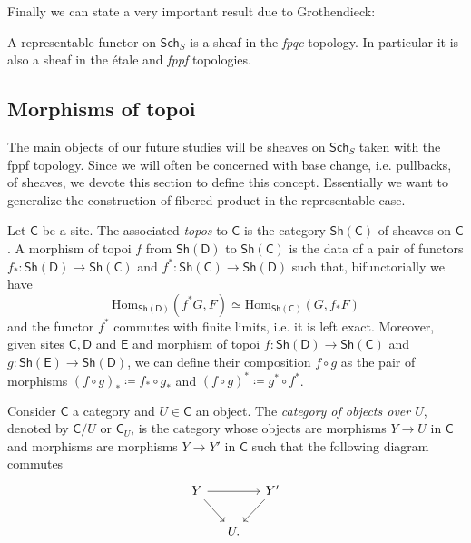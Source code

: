 \noindent
Finally we can state a very important result due to Grothendieck:
\begin{thm}\label{thm:reprFctSheaf}
	A representable functor on $\mathsf{Sch}_{ S }$ is a sheaf in the {\em fpqc} topology.
	In particular it is also a sheaf in the étale and {\em fppf} topologies.
\end{thm}



\subsection{Morphisms of topoi}
The main objects of our future studies will be sheaves on
$\mathsf{Sch}_{ S }$ taken with the fppf topology.
Since we will often be concerned with base change, i.e. pullbacks,
of sheaves, we devote this section to define this concept.
Essentially we want to generalize the construction
of fibered product in the representable case.


\begin{defn}[Topoi]
	Let $\mathsf{C}$ be a site.
	The associated {\em topos} to $\mathsf{C}$ is the category $\mathsf{Sh}\left(\mathsf{C}\right)$
	of sheaves on $\mathsf{C}$.
	A morphism of topoi $f$ from $\mathsf{Sh}\left(\mathsf{D}\right)$
	to $\mathsf{Sh}\left(\mathsf{C}\right)$ is the data of a pair
	of functors $f_*\colon \mathsf{Sh}\left(\mathsf{D}\right) \to \mathsf{Sh}\left(\mathsf{C}\right)$
	and $f^*\colon \mathsf{Sh}\left(\mathsf{C}\right) \to \mathsf{Sh}\left(\mathsf{D}\right)$
	such that, bifunctorially we have
	\begin{equation*}
		\mathrm{Hom}_{\mathsf{Sh}(\mathsf{D})} \left( f^*G, F \right) \simeq
		\mathrm{Hom}_{\mathsf{Sh}(\mathsf{C})} \left( G, f_*F \right) 
	\end{equation*}
	and the functor $f^*$ commutes with finite limits, i.e. it
	is left exact.
	Moreover, given sites $\mathsf{C}, \mathsf{D}$ and $\mathsf{E}$
	and morphism of topoi 
	$f\colon \mathsf{Sh}\left(\mathsf{D}\right) \to \mathsf{Sh}\left(\mathsf{C}\right)$ and
	$g\colon \mathsf{Sh}\left(\mathsf{E}\right) \to \mathsf{Sh}\left(\mathsf{D}\right)$,
	we can define their composition $f \circ g$
	as the pair of morphisms $\left( f \circ g \right)_* \coloneqq f_* \circ g_*$
	and $\left( f \circ g \right)^* \coloneqq g^* \circ f^*$.
\end{defn}


\begin{defn}
	Consider $\mathsf{C}$ a category and $U \in \mathsf{C}$ an object.
	The {\em category of objects over $U$}, denoted by $\mathsf{C}/U$
	or $\mathsf{C}_U$, is the category whose objects are morphisms
	$Y \to U$ in $\mathsf{C}$ and morphisms are morphisms $Y \to Y'$
	in $\mathsf{C}$ such that the following diagram commutes
	\begin{equation*}
	\begin{tikzcd}[column sep=1.2em]
		Y \arrow[rr, "", rightarrow] 
		\arrow[rd, "", rightarrow] & &
		Y' \arrow[ld, "", rightarrow] \\
		&
		U
	.\end{tikzcd}
	\end{equation*}
\end{defn}


